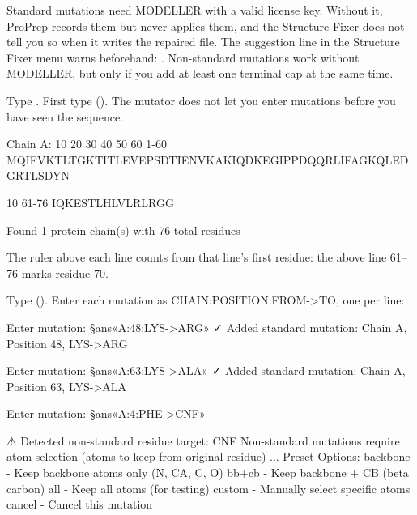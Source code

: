 \begin{needsoftware}
Standard mutations need MODELLER with a valid license key. Without it, ProPrep
records them but never applies them, and the Structure Fixer does not tell you
so when it writes the repaired file. The suggestion line in the Structure Fixer
menu warns beforehand: . Non-standard mutations work without MODELLER, but only
if you add at least one terminal cap at the same time.
\end{needsoftware}

\begin{steps}
  \item Type . First type 
        (). The mutator does
        not let you enter mutations before you have seen the sequence.
\begin{screen}
Chain A:
                 10        20        30        40        50        60
   1-60  MQIFVKTLTGKTITLEVEPSDTIENVKAKIQDKEGIPPDQQRLIFAGKQLEDGRTLSDYN

                 10
  61-76  IQKESTLHLVLRLRGG

Found 1 protein chain(s) with 76 total residues
\end{screen}
        The ruler above each line counts from that line's first residue: the
         above line 61--76 marks residue 70.
  \item Type  (). Enter each
        mutation as \textsf{CHAIN:POSITION:FROM->TO}, one per line:
\begin{screen}
Enter mutation: §ans«A:48:LYS->ARG»
✓ Added standard mutation: Chain A, Position 48, LYS->ARG

Enter mutation: §ans«A:63:LYS->ALA»
✓ Added standard mutation: Chain A, Position 63, LYS->ALA

Enter mutation: §ans«A:4:PHE->CNF»

⚠ Detected non-standard residue target: CNF
Non-standard mutations require atom selection (atoms to keep from original
residue)
...
Preset Options:
  backbone  - Keep backbone atoms only (N, CA, C, O)
  bb+cb     - Keep backbone + CB (beta carbon)
  all       - Keep all atoms (for testing)
  custom    - Manually select specific atoms
  cancel    - Cancel this mutation


\end{screen}
\end{steps}
